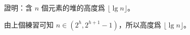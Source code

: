 證明：含 $n$ 個元素的堆的高度爲 $\lfloor \lg{n} \rfloor$。
\stopEXERCISE

\startANSWER
由上個練習可知 $n \in (2^h, 2^{h+1} - 1)$，所以高度爲 $\lfloor \lg{n} \rfloor$。
\stopANSWER
